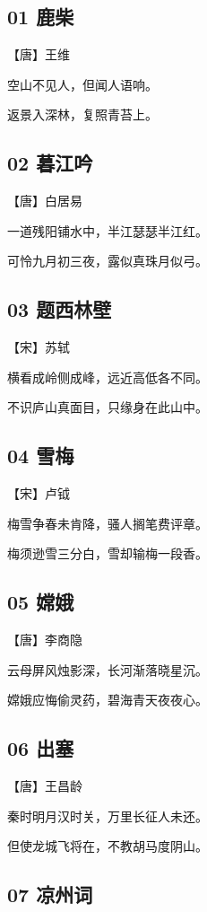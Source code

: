 \documentclass[12pt]{article}
\begin{document}
\subsection*{01 鹿柴}

【唐】王维

空山不见人，但闻人语响。

返景入深林，复照青苔上。

\subsection*{02 暮江吟}

【唐】白居易

一道残阳铺水中，半江瑟瑟半江红。

可怜九月初三夜，露似真珠月似弓。

\subsection*{03 题西林壁}

【宋】苏轼

横看成岭侧成峰，远近高低各不同。

不识庐山真面目，只缘身在此山中。

\subsection*{04 雪梅}

【宋】卢钺

梅雪争春未肯降，骚人搁笔费评章。

梅须逊雪三分白，雪却输梅一段香。

\subsection*{05 嫦娥}

【唐】李商隐

云母屏风烛影深，长河渐落晓星沉。

嫦娥应悔偷灵药，碧海青天夜夜心。

\subsection*{06 出塞}

【唐】王昌龄

秦时明月汉时关，万里长征人未还。

但使龙城飞将在，不教胡马度阴山。

\subsection*{07 凉州词}
\end{document}
